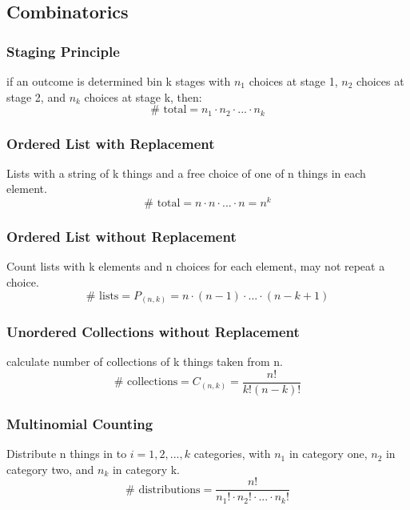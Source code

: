 \documentclass[landscape, 12pt]{report}
\begin{document}
\begin{multicols*}{3}
\subsection*{Combinatorics}
\subsubsection*{Staging Principle}
if an outcome is determined bin k stages with $n_1$ choices at stage 1, $n_2$  choices at stage 2, and $n_k$ choices at stage k, then:
\begin{equation}
    \#\text{ total} = n_1 \cdot n_2 \cdot ... \cdot n_k
\end{equation}
\subsubsection*{Ordered List with Replacement}
Lists with a string of k things and a free choice of one of n things in each element.
\begin{equation}
    \#\text{ total} = n \cdot n \cdot ... \cdot n = n^k
\end{equation}
\subsubsection*{Ordered List without Replacement}
Count lists with k elements and n choices for each element, may not repeat a choice.
\begin{equation}
    \#\text{ lists} =P_{(n,k)} = n\cdot(n-1)\cdot...\cdot(n-k+1)
\end{equation}
\subsubsection*{Unordered Collections without Replacement}
calculate number of collections of k things taken from n.
\begin{equation}
    \#\text{ collections} =C_{(n,k)} = \frac{n!}{k!(n-k)!}
\end{equation}
\subsubsection*{Multinomial Counting}
Distribute n things in to $i = 1,2,...,k$ categories, with $n_1$ in category one, $n_2$ in category two, and $n_k$ in category k.
\begin{equation}
    \#\text{ distributions} = \frac{n!}{n_1!\cdot n_2!\cdot...\cdot  n_k!}
\end{equation}

\end{multicols*}
\end{document}
